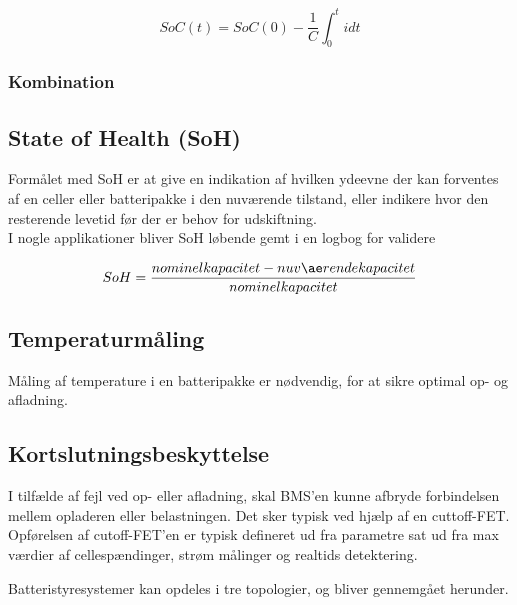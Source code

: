 \begin {equation} 
SoC(t) = SoC(0) - \frac{1}{C} \int_{0}^{t} idt  \label{eq:coulomb-count}
\end {equation}


\subsubsection{Kombination}


\subsection{State of Health (SoH)}
Formålet med SoH er at give en indikation af hvilken ydeevne der kan forventes af en celler eller batteripakke i den nuværende tilstand, eller indikere hvor den resterende levetid før der er behov for udskiftning.
\\
I nogle applikationer bliver SoH løbende gemt i en logbog for validere

\begin {equation} 
SoH = \frac{nominel \space kapacitet - nuværende  kapacitet}{nominel kapacitet} \label{eq:soh}
\end {equation}


\subsection{Temperaturmåling}
Måling af temperature i en batteripakke er nødvendig, for at sikre optimal op- og afladning. 

\subsection{Kortslutningsbeskyttelse}
I tilfælde af fejl ved op- eller afladning, skal BMS'en kunne afbryde forbindelsen mellem opladeren eller belastningen. Det sker typisk ved hjælp af en cuttoff-FET. Opførelsen af cutoff-FET'en er typisk defineret ud fra parametre sat ud fra max værdier af cellespændinger, strøm målinger og realtids detektering. 

Batteristyresystemer kan opdeles i tre topologier, og bliver gennemgået herunder.